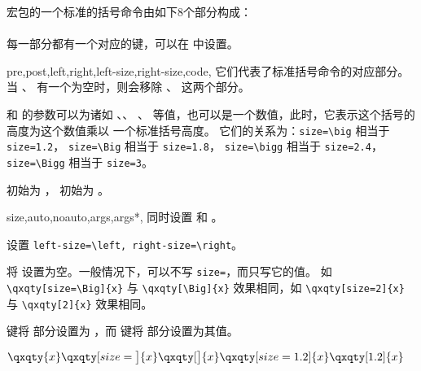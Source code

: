\documentclass{ctxdoc}
\newcounter{example}
\begin{document}
 宏包的一个标准的括号命令由如下8个部分构成：\\[2pt]
\\[4pt]
每一部分都有一个对应的键，可以在  中设置。

\begin{function}{
    pre,post,left,right,left-size,right-size,code,
}
    它们代表了标准括号命令的对应部分。当 、 
    有一个为空时，则会移除 、 这两个部分。

     和  的参数可以为诸如 、、
    、 等值，也可以是一个数值，此时，它表示这个括号的高度为这个数值乘以
一个标准括号高度。
    它们的关系为：\verb|size=\big| 相当于 \verb|size=1.2|，
    \verb|size=\Big| 相当于 \verb|size=1.8|，
    \verb|size=\bigg| 相当于 \verb|size=2.4|，
    \verb|size=\Bigg| 相当于 \verb|size=3|。

     初始为 ， 初始为 。
\end{function}

\begin{function}{
    size,auto,noauto,args,args*,
}
     同时设置  和 。
    
     设置 \verb+left-size=\left, right-size=\right+。

     将  设置为空。一般情况下，可以不写 \verb|size=|，而只写它的值。
    如 \verb|\qxqty[size=\Big]{x}| 与 \verb|\qxqty[\Big]{x}| 效果相同，如 \verb|\qxqty[size=2]{x}| 与 \verb|\qxqty[2]{x}| 效果相同。

     键将  部分设置为 ，而  键将
     部分设置为其值。
\end{function}

\begin{example}[]
$ \qxqty{x} \qxqty[size=\big]{x} \qxqty[\big]{x} \qxqty[size=1.2]{x} \qxqty[1.2]{x} $
\end{example}
\end{document}
